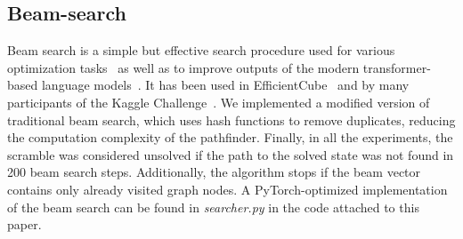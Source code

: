 
\subsection{\label{sec_search}Beam-search}
Beam search is a simple but effective search procedure used for various optimization tasks~\cite{hale2018finding, huang2019linearfold, scheidl2018word} as well as to improve outputs of the modern transformer-based language models~\cite{freitag2017beam, pryzant2023automatic, musolesi2024creative}. It has been used in EfficientCube~\cite{takano2023selfsupervision} and by many participants of the Kaggle Challenge~\cite{santa-2023}. We implemented a modified version of traditional beam search, which uses hash functions to remove duplicates, reducing the computation complexity of the pathfinder. Finally, in all the experiments, the scramble was considered unsolved if the path to the solved state was not found in 200 beam search steps. Additionally, the algorithm stops if the beam vector contains only already visited graph nodes. A PyTorch-optimized implementation of the beam search can be found in \textit{searcher.py} in the code attached to this paper.